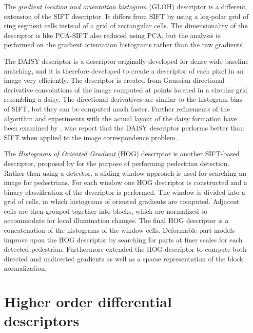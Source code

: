 \documentclass[thesis.tex]{subfiles}
\begin{document}
The \emph{gradient location and orientation histogram} (GLOH) descriptor \cite{mikolajczyk2005performance} is a different extension of the SIFT descriptor. It differs from SIFT by using a log-polar grid of ring segment cells instead of a grid of rectangular cells. The dimensionality of the descriptor is like PCA-SIFT also reduced using PCA, but the analysis is performed on the gradient orientation histograms rather than the raw gradients.

The DAISY descriptor \cite{tola2008fast} is a descriptor originally developed for dense wide-baseline matching, and it is therefore developed to create a descriptor of each pixel in an image very efficiently. The descriptor is created from Gaussian directional derivative convolutions of the image computed at points located in a circular grid resembling a daisy. The directional derivatives are similar to the histogram bins of SIFT, but they can be computed much faster. Further refinements of the algorithm and experiments with the actual layout of the daisy formation have been examined by \citet{winder2009picking}, who report that the DAISY descriptor performs better than SIFT when applied to the image correspondence problem.

The \emph{Histograms of Oriented Gradient} (HOG) descriptor is another SIFT-based descriptor, proposed by \citet{dalal2005histograms} for the purpose of performing pedestrian detection. Rather than using a detector, a sliding window approach is used for searching an image for pedestrians. For each window one HOG descriptor is constructed and a binary classification of the descriptor is performed. The window is divided into a grid of cells, in which histograms of oriented gradients are computed. Adjacent cells are then grouped together into blocks, which are normalized to accommodate for local illumination changes. The final HOG descriptor is a concatenation of the histograms of the window cells. Deformable part models \cite{felzenszwalb2008discriminatively} improve upon the HOG descriptor by searching for parts at finer scales for each detected pedestrian. Furthermore \citet{felzenszwalb2009object} extended the HOG descriptor to compute both directed and undirected gradients as well as a sparse representation of the block normalization.

\section{Higher order differential descriptors}
\end{document}
